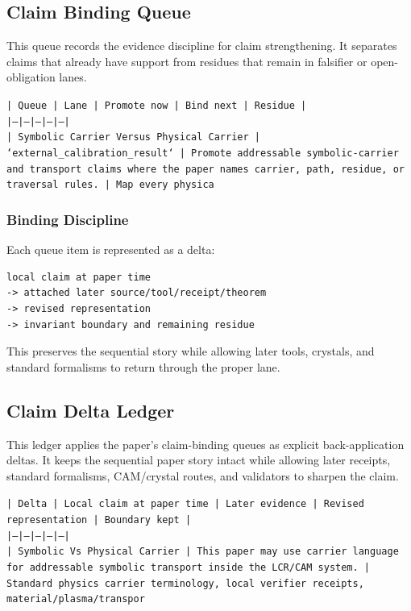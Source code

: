 \documentclass[11pt]{article}
\begin{document}
\subsection*{Claim Binding Queue}

This queue records the evidence discipline for claim strengthening. It separates claims that already have support from residues that remain in falsifier or open-obligation lanes.

\noindent\texttt{| Queue | Lane | Promote now | Bind next | Residue |}\\
\noindent\texttt{|---|---|---|---|---|}\\
\noindent\texttt{| Symbolic Carrier Versus Physical Carrier | `external\_calibration\_result` | Promote addressable symbolic-carrier and transport claims where the paper names carrier, path, residue, or traversal rules. | Map every physica}\\

\subsubsection*{Binding Discipline}

Each queue item is represented as a delta:

\begin{verbatim}
local claim at paper time
-> attached later source/tool/receipt/theorem
-> revised representation
-> invariant boundary and remaining residue
\end{verbatim}

This preserves the sequential story while allowing later tools, crystals, and
standard formalisms to return through the proper lane.

\subsection*{Claim Delta Ledger}

This ledger applies the paper's claim-binding queues as explicit back-application
deltas. It keeps the sequential paper story intact while allowing later
receipts, standard formalisms, CAM/crystal routes, and validators to sharpen the
claim.

\noindent\texttt{| Delta | Local claim at paper time | Later evidence | Revised representation | Boundary kept |}\\
\noindent\texttt{|---|---|---|---|---|}\\
\noindent\texttt{| Symbolic Vs Physical Carrier | This paper may use carrier language for addressable symbolic transport inside the LCR/CAM system. | Standard physics carrier terminology, local verifier receipts, material/plasma/transpor}\\
\end{document}
